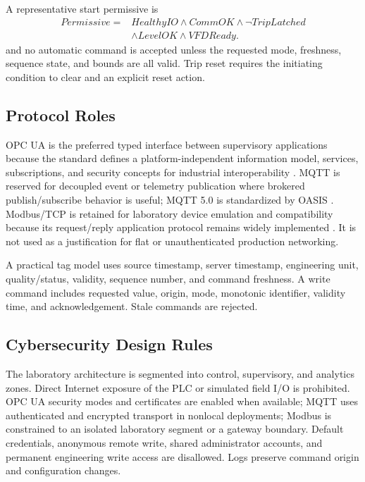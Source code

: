 \documentclass[conference]{IEEEtran}
\begin{document}
A representative start permissive is
\begin{equation}
\begin{aligned}
Permissive ={}& HealthyIO \land CommOK \land \neg TripLatched \\
& \land LevelOK \land VFDReady.
\end{aligned}
\end{equation}
and no automatic command is accepted unless the requested mode, freshness, sequence state, and bounds are all valid. Trip reset requires the initiating condition to clear and an explicit reset action.

\subsection{Protocol Roles}
OPC UA is the preferred typed interface between supervisory applications because the standard defines a platform-independent information model, services, subscriptions, and security concepts for industrial interoperability \cite{opcua}. MQTT is reserved for decoupled event or telemetry publication where brokered publish/subscribe behavior is useful; MQTT 5.0 is standardized by OASIS \cite{mqtt5}. Modbus/TCP is retained for laboratory device emulation and compatibility because its request/reply application protocol remains widely implemented \cite{modbus}. It is not used as a justification for flat or unauthenticated production networking.

A practical tag model uses source timestamp, server timestamp, engineering unit, quality/status, validity, sequence number, and command freshness. A write command includes requested value, origin, mode, monotonic identifier, validity time, and acknowledgement. Stale commands are rejected.

\subsection{Cybersecurity Design Rules}
The laboratory architecture is segmented into control, supervisory, and analytics zones. Direct Internet exposure of the PLC or simulated field I/O is prohibited. OPC UA security modes and certificates are enabled when available; MQTT uses authenticated and encrypted transport in nonlocal deployments; Modbus is constrained to an isolated laboratory segment or a gateway boundary. Default credentials, anonymous remote write, shared administrator accounts, and permanent engineering write access are disallowed. Logs preserve command origin and configuration changes.
\end{document}
